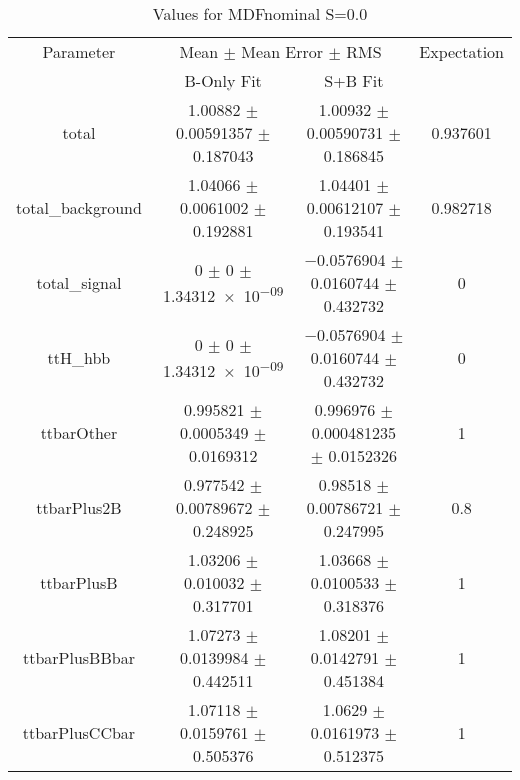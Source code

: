 \begin{table}
\centering
\caption{Values for MDFnominal S=0.0}
\begin{tabular}{cccc}
\toprule
Parameter & \multicolumn{2}{c}{Mean $\pm$ Mean Error $\pm$ RMS} & Expectation\\
 & B-Only Fit & S+B Fit & \\
\midrule
total & \num{1.00882} $\pm$ \num{0.00591357} $\pm$ \num{0.187043} & \num{1.00932} $\pm$ \num{0.00590731} $\pm$ \num{0.186845} & \num{0.937601}\\
total\_background & \num{1.04066} $\pm$ \num{0.0061002} $\pm$ \num{0.192881} & \num{1.04401} $\pm$ \num{0.00612107} $\pm$ \num{0.193541} & \num{0.982718}\\
total\_signal & \num{0} $\pm$ \num{0} $\pm$ \num{1.34312e-09} & \num{-0.0576904} $\pm$ \num{0.0160744} $\pm$ \num{0.432732} & \num{0}\\
ttH\_hbb & \num{0} $\pm$ \num{0} $\pm$ \num{1.34312e-09} & \num{-0.0576904} $\pm$ \num{0.0160744} $\pm$ \num{0.432732} & \num{0}\\
ttbarOther & \num{0.995821} $\pm$ \num{0.0005349} $\pm$ \num{0.0169312} & \num{0.996976} $\pm$ \num{0.000481235} $\pm$ \num{0.0152326} & \num{1}\\
ttbarPlus2B & \num{0.977542} $\pm$ \num{0.00789672} $\pm$ \num{0.248925} & \num{0.98518} $\pm$ \num{0.00786721} $\pm$ \num{0.247995} & \num{0.8}\\
ttbarPlusB & \num{1.03206} $\pm$ \num{0.010032} $\pm$ \num{0.317701} & \num{1.03668} $\pm$ \num{0.0100533} $\pm$ \num{0.318376} & \num{1}\\
ttbarPlusBBbar & \num{1.07273} $\pm$ \num{0.0139984} $\pm$ \num{0.442511} & \num{1.08201} $\pm$ \num{0.0142791} $\pm$ \num{0.451384} & \num{1}\\
ttbarPlusCCbar & \num{1.07118} $\pm$ \num{0.0159761} $\pm$ \num{0.505376} & \num{1.0629} $\pm$ \num{0.0161973} $\pm$ \num{0.512375} & \num{1}\\
\bottomrule
\end{tabular}
\end{table}